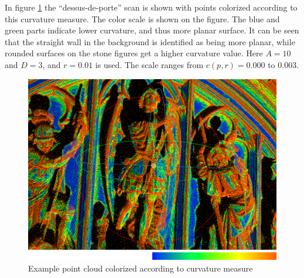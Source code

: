In figure \ref{fig:curvature_example} the ``dessus-de-porte'' scan is shown with points colorized according to this curvature measure. The color scale is shown on the figure. The blue and green parts indicate lower curvature, and thus more planar surface. It can be seen that the straight wall in the background is identified as being more planar, while rounded surfaces on the stone figures get a higher curvature value. Here $A = 10$ and $D = 3$, and $r = 0.01$ is used. The scale ranges from $c(p, r) = 0.000$ to $0.003$.


\begin{figure}[h]
\centering
\includegraphics[width=.7\textwidth]{fig/curvature_example.png}
\caption{Example point cloud colorized according to curvature measure}
\label{fig:curvature_example}
\end{figure}

\FloatBarrier

